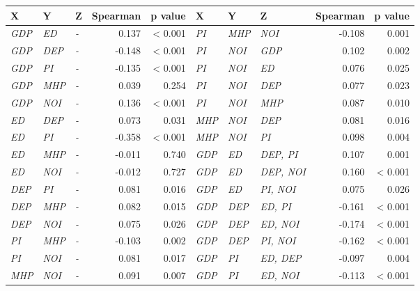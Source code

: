 \begin{tabular}{lllrr|lllrr}
\toprule
X & Y & Z & Spearman & p value & X & Y & Z & Spearman & p value \\
\midrule
\textit{GDP} & \textit{ED} & \textit{-} & 0.137 & \textless{} 0.001 & \textit{PI} & \textit{MHP} & \textit{NOI} & -0.108 & 0.001 \\
\textit{GDP} & \textit{DEP} & \textit{-} & -0.148 & \textless{} 0.001 & \textit{PI} & \textit{NOI} & \textit{GDP} & 0.102 & 0.002 \\
\textit{GDP} & \textit{PI} & \textit{-} & -0.135 & \textless{} 0.001 & \textit{PI} & \textit{NOI} & \textit{ED} & 0.076 & 0.025 \\
\textit{GDP} & \textit{MHP} & \textit{-} & 0.039 & 0.254 & \textit{PI} & \textit{NOI} & \textit{DEP} & 0.077 & 0.023 \\
\textit{GDP} & \textit{NOI} & \textit{-} & 0.136 & \textless{} 0.001 & \textit{PI} & \textit{NOI} & \textit{MHP} & 0.087 & 0.010 \\
\textit{ED} & \textit{DEP} & \textit{-} & 0.073 & 0.031 & \textit{MHP} & \textit{NOI} & \textit{DEP} & 0.081 & 0.016 \\
\textit{ED} & \textit{PI} & \textit{-} & -0.358 & \textless{} 0.001 & \textit{MHP} & \textit{NOI} & \textit{PI} & 0.098 & 0.004 \\
\textit{ED} & \textit{MHP} & \textit{-} & -0.011 & 0.740 & \textit{GDP} & \textit{ED} & \textit{DEP, PI} & 0.107 & 0.001 \\
\textit{ED} & \textit{NOI} & \textit{-} & -0.012 & 0.727 & \textit{GDP} & \textit{ED} & \textit{DEP, NOI} & 0.160 & \textless{} 0.001 \\
\textit{DEP} & \textit{PI} & \textit{-} & 0.081 & 0.016 & \textit{GDP} & \textit{ED} & \textit{PI, NOI} & 0.075 & 0.026 \\
\textit{DEP} & \textit{MHP} & \textit{-} & 0.082 & 0.015 & \textit{GDP} & \textit{DEP} & \textit{ED, PI} & -0.161 & \textless{} 0.001 \\
\textit{DEP} & \textit{NOI} & \textit{-} & 0.075 & 0.026 & \textit{GDP} & \textit{DEP} & \textit{ED, NOI} & -0.174 & \textless{} 0.001 \\
\textit{PI} & \textit{MHP} & \textit{-} & -0.103 & 0.002 & \textit{GDP} & \textit{DEP} & \textit{PI, NOI} & -0.162 & \textless{} 0.001 \\
\textit{PI} & \textit{NOI} & \textit{-} & 0.081 & 0.017 & \textit{GDP} & \textit{PI} & \textit{ED, DEP} & -0.097 & 0.004 \\
\textit{MHP} & \textit{NOI} & \textit{-} & 0.091 & 0.007 & \textit{GDP} & \textit{PI} & \textit{ED, NOI} & -0.113 & \textless{} 0.001 \\

\end{tabular}
